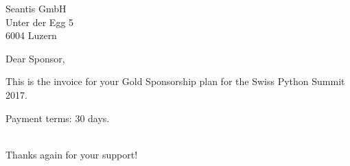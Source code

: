 \documentclass[SN,11pt,enlargefirstpage=true,sps]{scrlttr2}
\begin{document}
\begin{letter}{Seantis GmbH\\Unter der Egg 5\\6004 Luzern}

  \opening{Dear Sponsor,}

  This is the invoice for your Gold Sponsorship plan for the Swiss Python Summit 2017.

  \begin{invoice}{0.0}%
  \end{invoice}

  Payment terms: 30 days.

  \closing{\\Thanks again for your support!}

\end{letter}
\end{document}
